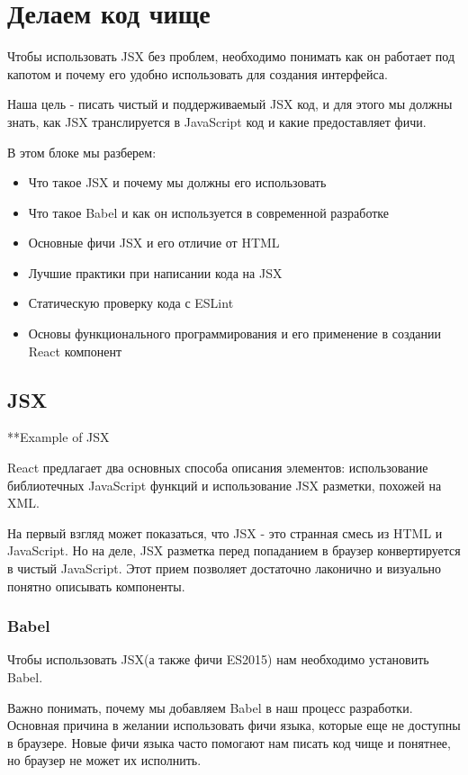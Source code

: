 \chapter{Делаем код чище}

Чтобы использовать JSX без проблем, необходимо понимать как он работает под капотом и почему его удобно использовать для создания интерфейса.

Наша цель - писать чистый и поддерживаемый JSX код, и для этого мы должны знать, как JSX транслируется в JavaScript код и какие предоставляет фичи.

В этом блоке мы разберем:

\begin{itemize}
  \item Что такое JSX и почему мы должны его использовать
  \item Что такое Babel и как он используется в современной разработке
  \item Основные фичи JSX и его отличие от HTML
  \item Лучшие практики при написании кода на JSX
  \item Статическую проверку кода с ESLint 
  \item Основы функционального программирования и его применение в создании React компонент
\end{itemize}


\section{JSX}

**Example of JSX

React предлагает два основных способа описания элементов: использование библиотечных JavaScript функций и использование JSX разметки, похожей на XML. 

На первый взгляд может показаться, что JSX - это странная смесь из HTML и JavaScript. Но на деле, JSX разметка перед попаданием в браузер конвертируется в чистый JavaScript. Этот прием позволяет достаточно лаконично и визуально понятно описывать компоненты.

\subsection{Babel}

Чтобы использовать JSX(а также фичи ES2015) нам необходимо установить Babel. 

Важно понимать, почему мы добавляем Babel в наш процесс разработки. Основная причина в желании использовать фичи языка, которые еще не доступны в браузере. Новые фичи языка часто помогают нам писать код чище и понятнее, но браузер не может их исполнить.

